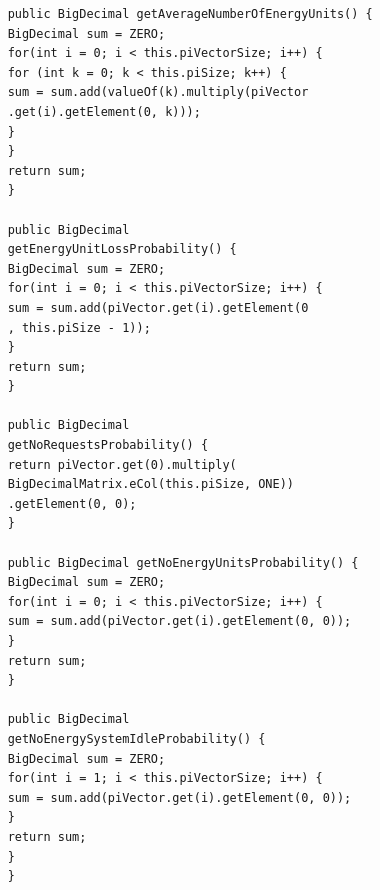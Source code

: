 \documentclass[12pt, a4paper]{article}
\begin{document}
\begin{enumerate}
\begin{verbatim}
	public BigDecimal getAverageNumberOfEnergyUnits() {
	BigDecimal sum = ZERO;
	for(int i = 0; i < this.piVectorSize; i++) {
	for (int k = 0; k < this.piSize; k++) {
	sum = sum.add(valueOf(k).multiply(piVector
	.get(i).getElement(0, k)));
	}
	}
	return sum;
	}
	
	public BigDecimal 
	getEnergyUnitLossProbability() {
	BigDecimal sum = ZERO;
	for(int i = 0; i < this.piVectorSize; i++) {
	sum = sum.add(piVector.get(i).getElement(0
	, this.piSize - 1));
	}
	return sum;
	}
	
	public BigDecimal 
	getNoRequestsProbability() {
	return piVector.get(0).multiply(
	BigDecimalMatrix.eCol(this.piSize, ONE))
	.getElement(0, 0);
	}
	
	public BigDecimal getNoEnergyUnitsProbability() {
	BigDecimal sum = ZERO;
	for(int i = 0; i < this.piVectorSize; i++) {
	sum = sum.add(piVector.get(i).getElement(0, 0));
	}
	return sum;
	}
	
	public BigDecimal 
	getNoEnergySystemIdleProbability() {
	BigDecimal sum = ZERO;
	for(int i = 1; i < this.piVectorSize; i++) {
	sum = sum.add(piVector.get(i).getElement(0, 0));
	}
	return sum;
	}
	}
	\end{verbatim}
\end{enumerate}
\end{document}
